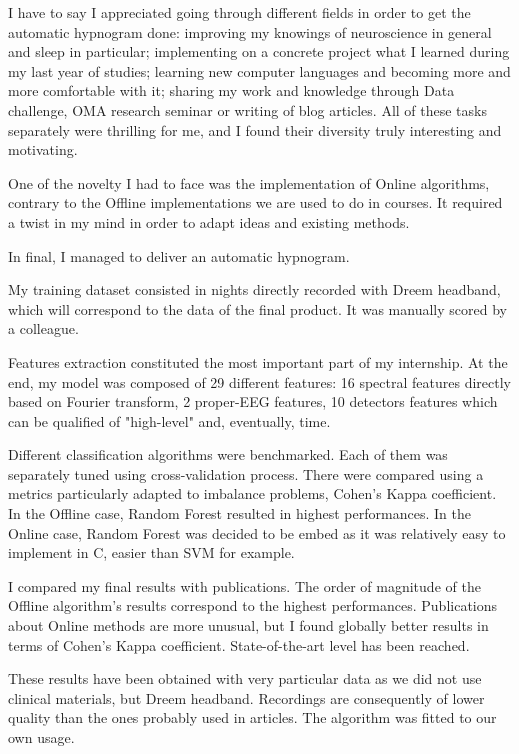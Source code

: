 \documentclass[12pt]{report}
\begin{document}
I have to say I appreciated going through different fields in order to get the automatic hypnogram done: improving my knowings of neuroscience in general and sleep in particular;  implementing on a concrete project what I learned during my last year of studies; learning new computer languages and becoming more and more comfortable with it; sharing my work and knowledge through Data challenge, OMA research seminar or writing of blog articles. All of these tasks separately were thrilling for me, and I found their diversity truly interesting and motivating.

One of the novelty I had to face was the implementation of Online algorithms, contrary to the Offline implementations we are used to do in courses. It required a twist in my mind in order to adapt ideas and existing methods.

\vspace{5mm}

In final, I managed to deliver an automatic hypnogram.

My training dataset consisted in nights directly recorded with Dreem headband, which will correspond to the data of the final product. It was manually scored by a colleague.

Features extraction constituted the most important part of my internship.
At the end, my model was composed of 29 different features: 16 spectral features directly based on Fourier transform, 2 proper-EEG features, 10 detectors features which can be qualified of "high-level" and, eventually, time.

Different classification algorithms were benchmarked. Each of them was separately tuned using cross-validation process. There were compared using a metrics particularly adapted to imbalance problems, Cohen's Kappa coefficient. In the Offline case, Random Forest resulted in highest performances. In the Online case, Random Forest was decided to be embed as it was relatively easy to implement in C, easier than SVM for example.

I compared my final results with publications. The order of magnitude of the Offline algorithm's results correspond to the highest performances. Publications about Online methods are more unusual, but I found globally better results in terms of Cohen's Kappa coefficient. State-of-the-art level has been reached.

\vspace{5mm}

These results have been obtained with very particular data as we did not use clinical materials, but Dreem headband. Recordings are consequently of lower quality than the ones probably used in articles. The algorithm was fitted to our own usage.
\end{document}
